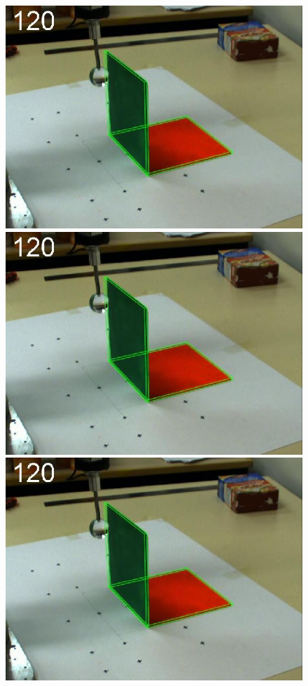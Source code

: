 \begin{figure}[tb]
{\includegraphics[width=\imgBXwid]{./B2_2exp_58_1}
\includegraphics[width=\imgBXwid]{./B2_1exp_58_1}
\includegraphics[width=\imgBXwid]{./B2_LWPR1_58_1}
}
\end{figure}
